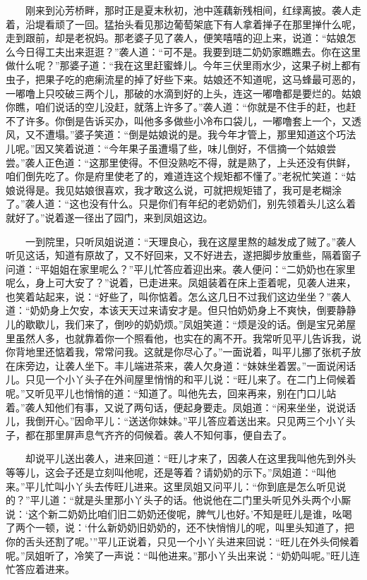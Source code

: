 　　刚来到沁芳桥畔，那时正是夏末秋初，池中莲藕新残相间，红绿离披。袭人走着，沿堤看顽了一回。猛抬头看见那边葡萄架底下有人拿着掸子在那里掸什么呢，走到跟前，却是老祝妈。那老婆子见了袭人，便笑嘻嘻的迎上来，说道：“姑娘怎么今日得工夫出来逛逛？”袭人道：“可不是。我要到琏二奶奶家瞧瞧去。你在这里做什么呢？”那婆子道：“我在这里赶蜜蜂儿。今年三伏里雨水少，这果子树上都有虫子，把果子吃的疤瘌流星的掉了好些下来。姑娘还不知道呢，这马蜂最可恶的，一嘟噜上只咬破三两个儿，那破的水滴到好的上头，连这一嘟噜都是要烂的。姑娘你瞧，咱们说话的空儿没赶，就落上许多了。”袭人道：“你就是不住手的赶，也赶不了许多。你倒是告诉买办，叫他多多做些小冷布口袋儿，一嘟噜套上一个，又透风，又不遭塌。”婆子笑道：“倒是姑娘说的是。我今年才管上，那里知道这个巧法儿呢。”因又笑着说道：“今年果子虽遭塌了些，味儿倒好，不信摘一个姑娘尝尝。”袭人正色道：“这那里使得。不但没熟吃不得，就是熟了，上头还没有供鲜，咱们倒先吃了。你是府里使老了的，难道连这个规矩都不懂了。”老祝忙笑道：“姑娘说得是。我见姑娘很喜欢，我才敢这么说，可就把规矩错了，我可是老糊涂了。”袭人道：“这也没有什么。只是你们有年纪的老奶奶们，别先领着头儿这么着就好了。”说着遂一径出了园门，来到凤姐这边。

　　一到院里，只听凤姐说道：“天理良心，我在这屋里熬的越发成了贼了。”袭人听见这话，知道有原故了，又不好回来，又不好进去，遂把脚步放重些，隔着窗子问道：“平姐姐在家里呢么？”平儿忙答应着迎出来。袭人便问：“二奶奶也在家里呢么，身上可大安了？”说着，已走进来。凤姐装着在床上歪着呢，见袭人进来，也笑着站起来，说：“好些了，叫你惦着。怎么这几日不过我们这边坐坐？”袭人道：“奶奶身上欠安，本该天天过来请安才是。但只怕奶奶身上不爽快，倒要静静儿的歇歇儿，我们来了，倒吵的奶奶烦。”凤姐笑道：“烦是没的话。倒是宝兄弟屋里虽然人多，也就靠着你一个照看他，也实在的离不开。我常听见平儿告诉我，说你背地里还惦着我，常常问我。这就是你尽心了。”一面说着，叫平儿挪了张杌子放在床旁边，让袭人坐下。丰儿端进茶来，袭人欠身道：“妹妹坐着罢。”一面说闲话儿。只见一个小丫头子在外间屋里悄悄的和平儿说：“旺儿来了。在二门上伺候着呢。”又听见平儿也悄悄的道：“知道了。叫他先去，回来再来，别在门口儿站着。”袭人知他们有事，又说了两句话，便起身要走。凤姐道：“闲来坐坐，说说话儿，我倒开心。”因命平儿：“送送你妹妹。”平儿答应着送出来。只见两三个小丫头子，都在那里屏声息气齐齐的伺候着。袭人不知何事，便自去了。

　　却说平儿送出袭人，进来回道：“旺儿才来了，因袭人在这里我叫他先到外头等等儿，这会子还是立刻叫他呢，还是等着？请奶奶的示下。”凤姐道：“叫他来。”平儿忙叫小丫头去传旺儿进来。这里凤姐又问平儿：“你到底是怎么听见说的？”平儿道：“就是头里那小丫头子的话。他说他在二门里头听见外头两个小厮说：‘这个新二奶奶比咱们旧二奶奶还俊呢，脾气儿也好。’不知是旺儿是谁，吆喝了两个一顿，说：‘什么新奶奶旧奶奶的，还不快悄悄儿的呢，叫里头知道了，把你的舌头还割了呢。’”平儿正说着，只见一个小丫头进来回说：“旺儿在外头伺候着呢。”凤姐听了，冷笑了一声说：“叫他进来。”那小丫头出来说：“奶奶叫呢。”旺儿连忙答应着进来。

